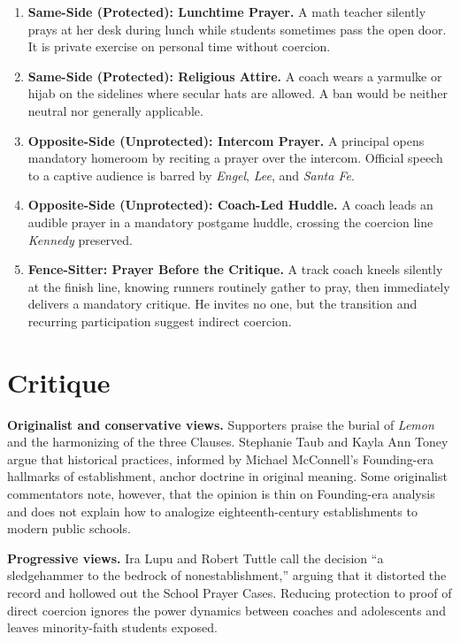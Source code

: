 \documentclass[12pt]{article}
\begin{document}
\begin{enumerate}
\item \textbf{Same-Side (Protected): Lunchtime Prayer.} A math teacher silently prays at her desk during lunch while students sometimes pass the open door. It is private exercise on personal time without coercion.
\item \textbf{Same-Side (Protected): Religious Attire.} A coach wears a yarmulke or hijab on the sidelines where secular hats are allowed. A ban would be neither neutral nor generally applicable.
\item \textbf{Opposite-Side (Unprotected): Intercom Prayer.} A principal opens mandatory homeroom by reciting a prayer over the intercom. Official speech to a captive audience is barred by \textit{Engel}, \textit{Lee}, and \textit{Santa Fe}.
\item \textbf{Opposite-Side (Unprotected): Coach-Led Huddle.} A coach leads an audible prayer in a mandatory postgame huddle, crossing the coercion line \textit{Kennedy} preserved.
\item \textbf{Fence-Sitter: Prayer Before the Critique.} A track coach kneels silently at the finish line, knowing runners routinely gather to pray, then immediately delivers a mandatory critique. He invites no one, but the transition and recurring participation suggest indirect coercion.
\end{enumerate}

\section{Critique}

\textbf{Originalist and conservative views.} Supporters praise the burial of \textit{Lemon} and the harmonizing of the three Clauses. Stephanie Taub and Kayla Ann Toney argue that historical practices, informed by Michael McConnell's Founding-era hallmarks of establishment, anchor doctrine in original meaning. Some originalist commentators note, however, that the opinion is thin on Founding-era analysis and does not explain how to analogize eighteenth-century establishments to modern public schools.

\textbf{Progressive views.} Ira Lupu and Robert Tuttle call the decision ``a sledgehammer to the bedrock of nonestablishment,'' arguing that it distorted the record and hollowed out the School Prayer Cases. Reducing protection to proof of direct coercion ignores the power dynamics between coaches and adolescents and leaves minority-faith students exposed.
\end{document}
